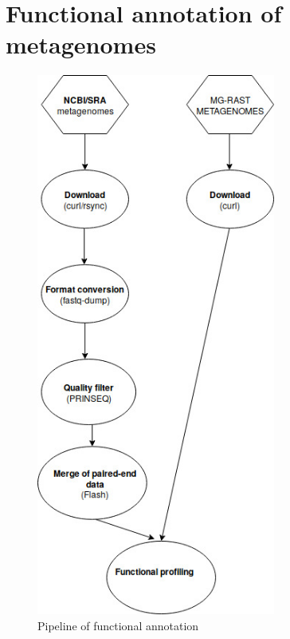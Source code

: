 \documentclass[12pt, a4paper]{report}
\begin{document}
\chapter{Functional annotation of metagenomes}
\begin{figure}
  \centering 
  \includegraphics[width=0.7\textwidth]{figures/pipeline_functional.jpg}
  \caption{Pipeline of functional annotation}
  \label{texworks} 
  \end{figure}
\end{document}
